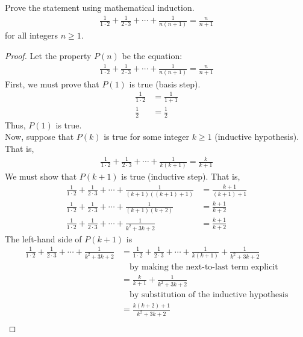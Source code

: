 \documentclass[name=Ojas\ Chaturvedi, emailid=oj.chaturvedi.2024, course=Capstone:\ Discrete\ Math, num=8, deadline={November\ 2,\ 2023}]{homework}
\begin{document}
Prove the statement using mathematical induction.
\begin{align*}
    \frac{1}{1 \cdot 2} + \frac{1}{2 \cdot 3} + \cdots + \frac{1}{n(n+1)} = \frac{n}{n+1}
\end{align*}
for all integers $n \geq 1$.
\begin{proof}
    Let the property $P(n)$ be the equation:
    \begin{align*}
        \frac{1}{1 \cdot 2} + \frac{1}{2 \cdot 3} + \cdots + \frac{1}{n(n+1)} = \frac{n}{n+1}
    \end{align*}
    First, we must prove that $P(1)$ is true (basis step). \\
    \begin{align*}
        \frac{1}{1 \cdot 2} &= \frac{1}{1+1} \\
        \frac{1}{2} &= \frac{1}{2}
    \end{align*}
    Thus, $P(1)$ is true. \\
    Now, suppose that $P(k)$ is true for some integer $k \geq 1$ (inductive hypothesis). That is,
    \begin{align*}
        \frac{1}{1 \cdot 2} + \frac{1}{2 \cdot 3} + \cdots + \frac{1}{k(k+1)} = \frac{k}{k+1}
    \end{align*}
    We must show that $P(k+1)$ is true (inductive step). That is,
    \begin{align*}
        \frac{1}{1 \cdot 2} + \frac{1}{2 \cdot 3} + \cdots + \frac{1}{(k+1)((k+1)+1)} &= \frac{k+1}{(k+1)+1} \\
        \frac{1}{1 \cdot 2} + \frac{1}{2 \cdot 3} + \cdots + \frac{1}{(k+1)(k+2)} &= \frac{k+1}{k+2} \\
        \frac{1}{1 \cdot 2} + \frac{1}{2 \cdot 3} + \cdots + \frac{1}{k^2 + 3k + 2} &= \frac{k+1}{k+2}
    \end{align*}
    The left-hand side of $P(k+1)$ is
    \begin{align*}
        \frac{1}{1 \cdot 2} + \frac{1}{2 \cdot 3} + \cdots + \frac{1}{k^2 + 3k + 2} &= \frac{1}{1 \cdot 2} + \frac{1}{2 \cdot 3} + \cdots + \frac{1}{k(k+1)} + \frac{1}{k^2 + 3k + 2} \\
        & \quad \text{by making the next-to-last term explicit} \\
        &= \frac{k}{k+1} + \frac{1}{k^2 + 3k + 2} \\
        & \quad \text{by substitution of the inductive hypothesis} \\
        &= \frac{k(k+2)+1}{k^2+3k+2} \\

\end{align*}
\end{proof}
\end{document}
